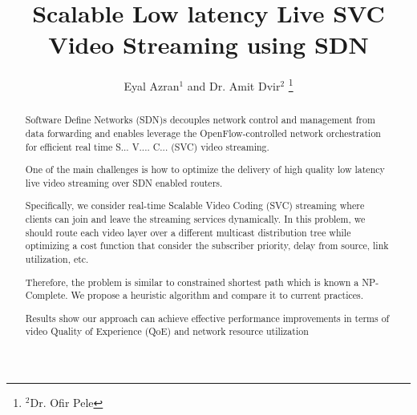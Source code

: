 \documentclass[a4paper, 10pt, conference]{ieeeconf}
\title{\LARGE \bf
Scalable Low latency Live SVC Video Streaming using SDN
}
\author{Eyal Azran$^{1}$ and Dr. Amit Dvir$^{2}$%
\thanks{$^{2}$Dr. Ofir Pele
        {\tt\small }}%
}
\begin{document}
\maketitle
\thispagestyle{plain}
\pagestyle{empty}

\begin{abstract}


Software Define Networks (SDN)s decouples network control and management from data forwarding and enables leverage the OpenFlow-controlled network orchestration for efficient real time S... V.... C... (SVC) video streaming. 

 One of the main challenges is how to optimize the delivery of high quality low latency live video streaming over SDN enabled routers.
 
 Specifically, we consider real-time Scalable Video Coding (SVC) streaming where clients can join and leave the streaming services dynamically. In this problem, we should route each video layer over a different multicast distribution tree while optimizing a cost function that consider the subscriber priority, delay from source, link utilization, etc. 
 
 Therefore, the problem is similar to constrained shortest path which is known a NP-Complete. We propose a heuristic algorithm and compare it to current practices. 
 
 Results show our approach can achieve effective performance improvements in terms of video Quality of Experience (QoE) and network resource utilization

\end{abstract}
\end{document}
